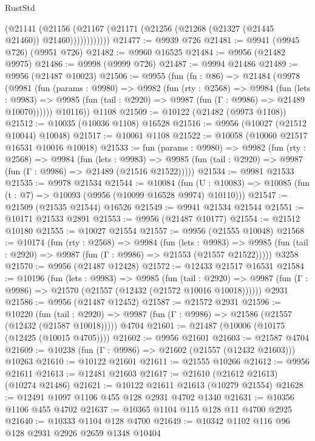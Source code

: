 \begin{lexlean}{RustStd}
\begin{coremodule}
                (@21141
                  (@21156
                    (@21167 (@21171 (@21256 (@21268 (@21327 (@21445 @21460)) @21460))))))))))))
@21477 := @9939 @726
@21481 := @9941 (@9945 @726) (@9951 @726)
@21482 := @9960 @16525
@21484 := @9956 (@21482 @9975)
@21486 := @9998 (@9999 @726)
@21487 := @9994 @21486
@21489 := @9956 (@21487 @10023)
@21506 := @9955
    (fun (fn : @86) =>
    @21484
      (@9978
        (@9981
          (fun (params : @9980) =>
          @9982
            (fun (rty : @2568) =>
            @9984
              (fun (lets : @9983) =>
              @9985 (fun (tail : @2920) => @9987 (fun (Γ : @9986) => @21489 @10070))))))
        @10116))
    @1108
@21509 := @10122 (@21482 (@9973 @1108))
@21512 := @10035 (@10036 @1108) @16528
@21516 := @9956 (@10027 (@21512 @10044) @10048)
@21517 := @10061 @1108
@21522 := @10058 (@10060 @21517 @16531 @10016 @10018)
@21533 := fun (params : @9980) =>
  @9982
    (fun (rty : @2568) =>
    @9984
      (fun (lets : @9983) =>
      @9985 (fun (tail : @2920) => @9987 (fun (Γ : @9986) => @21489 (@21516 @21522)))))
@21534 := @9981 @21533
@21535 := @9978 @21534
@21544 := @10084
    (fun (U : @10083) => @10085 (fun (t : @7) => @10093 (@9956 (@10099 @16528 @9974) @10110)))
@21547 := @21509 (@21535 @21544) @16526
@21549 := @9941 @21534 @21544
@21551 := @10171 @21533 @2891
@21553 := @9956 (@21487 @10177)
@21554 := @21512 @10180
@21555 := @10027 @21554
@21557 := @9956 (@21555 @10048)
@21568 := @10174
    (fun (rty : @2568) =>
    @9984
      (fun (lets : @9983) =>
      @9985 (fun (tail : @2920) => @9987 (fun (Γ : @9986) => @21553 (@21557 @21522)))))
    @3258
@21570 := @9956 (@21487 @12428)
@21572 := @12433 @21517 @16531
@21584 := @10196
    (fun (lets : @9983) =>
    @9985
      (fun (tail : @2920) =>
      @9987 (fun (Γ : @9986) => @21570 (@21557 (@12432 (@21572 @10016 @10018))))))
    @2931
@21586 := @9956 (@21487 @12452)
@21587 := @21572 @2931
@21596 := @10220
    (fun (tail : @2920) => @9987 (fun (Γ : @9986) => @21586 (@21557 (@12432 (@21587 @10018)))))
    @4704
@21601 := @21487 (@10006 (@10175 (@12425 (@10015 @4705))))
@21602 := @9956 @21601
@21603 := @21587 @4704
@21609 := @10238 (fun (Γ : @9986) => @21602 (@21557 (@12432 @21603))) @10263
@21610 := @10122 @21601
@21611 := @21555 @10266
@21612 := @9956 @21611
@21613 := @12481 @21603
@21617 := @21610 (@21612 @21613) (@10274 @21486)
@21621 := @10122 @21611 @21613 (@10279 @21554)
@21628 := @12491 @1097 @1106 @455 @128 @2931 @4702 @1340
@21631 := @10356 @1106 @455 @4702
@21637 := @10365 @1104 @115 @128 @11 @4700 @2925
@21640 := @10333 @1104 @128 @4700
@21649 := @10342 @1102 @116 @96 @128 @2931 @2926 @2659 @1348 @10404

\end{coremodule}
\end{lexlean}
